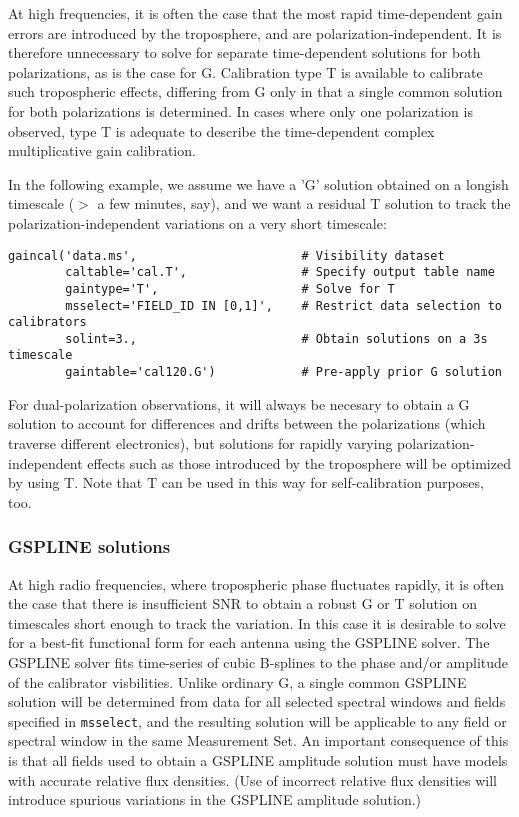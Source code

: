 At high frequencies, it is often the case that the most rapid
time-dependent gain errors are introduced by the troposphere, and are
polarization-independent.  It is therefore unnecessary to solve for
separate time-dependent solutions for both polarizations, as is the
case for G.  Calibration type T is available to calibrate such
tropospheric effects, differing from G only in that a single common
solution for both polarizations is determined.  In cases where only
one polarization is observed, type T is adequate to describe the
time-dependent complex multiplicative gain calibration.

In the following example, we assume we have a 'G' solution obtained on
a longish timescale ($>$ a few minutes, say), and we want a residual
T solution to track the polarization-independent variations on a
very short timescale:

\small
\begin{verbatim}
gaincal('data.ms',                       # Visibility dataset
        caltable='cal.T',                # Specify output table name
        gaintype='T',                    # Solve for T
        msselect='FIELD_ID IN [0,1]',    # Restrict data selection to calibrators
        solint=3.,                       # Obtain solutions on a 3s timescale
        gaintable='cal120.G')            # Pre-apply prior G solution
\end{verbatim}
\normalsize

For dual-polarization observations, it will always be necesary to
obtain a G solution to account for differences and drifts between
the polarizations (which traverse different electronics), but
solutions for rapidly varying polarization-independent effects such as
those introduced by the troposphere will be optimized by using T.
Note that T can be used in this way for self-calibration purposes,
too.

\subsubsection{GSPLINE solutions}
\label{subsubsection:synth.gspline.solns}

At high radio frequencies, where tropospheric phase fluctuates
rapidly, it is often the case that there is insufficient SNR to obtain
a robust G or T solution on timescales short enough to track the
variation.  In this case it is desirable to solve for a best-fit
functional form for each antenna using the GSPLINE solver.  The
GSPLINE solver fits time-series of cubic B-splines to the phase and/or
amplitude of the calibrator visbilities.  Unlike ordinary G, a single
common GSPLINE solution will be determined from data for all selected
spectral windows and fields specified in {\tt msselect}, and the resulting
solution will be applicable to any field or spectral window in the
same Measurement Set.  An important consequence of this is that all
fields used to obtain a GSPLINE amplitude solution must have models
with accurate relative flux densities.  (Use of incorrect relative
flux densities will introduce spurious variations in the GSPLINE
amplitude solution.)

